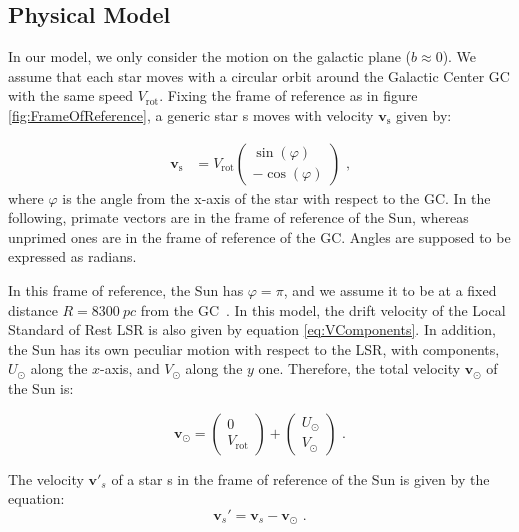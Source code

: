 \subsection{Physical Model}\label{subsec:PhysicalModel}


In our model, we only consider the motion on the galactic plane ($b\approx0$). We assume that each star moves with a circular orbit around the Galactic Center GC with the same speed $V_{\text{rot}}$. Fixing the frame of reference as in figure \ref{fig:FrameOfReference}, a generic star s moves with velocity $\bm{v}_{\text{s}}$ given by:

\begin{equation}\label{eq:VComponents}
    \begin{aligned}
        \bm{v}_{\text{s}} &= V_{\text{rot}}\begin{pmatrix} \sin(\varphi) \\ -\cos(\varphi) \end{pmatrix} \text{ ,}
    \end{aligned}
\end{equation}
\noindent
where $\varphi$ is the angle from the x-axis of the star with respect to the GC. In the following, primate vectors are in the frame of reference of the Sun, whereas unprimed ones are in the frame of reference of the GC. Angles are supposed to be expressed as radians.



In this frame of reference, the Sun has $\varphi = \pi$, and we assume it to be at a fixed distance $R=\qty{8300}{pc}$ from the GC~\cite{GalacticKinematics}. In this model, the drift velocity of the Local Standard of Rest LSR is also given by equation \ref{eq:VComponents}. In addition, the Sun has its own peculiar motion with respect to the LSR, with components, $U_{\odot}$ along the $x$-axis, and $V_{\odot}$ along the $y$ one. Therefore, the total velocity $\bm{v}_{\odot}$ of the Sun is:

\begin{equation}\label{eq:VSun}
    \bm{v}_{\odot} = \begin{pmatrix} 0 \\ V_{\text{rot}} \end{pmatrix} + \begin{pmatrix} U_{\odot} \\ V_{\odot} \end{pmatrix} \text{ .}
\end{equation}

\noindent
The velocity $\bm{v'}_s$ of a star s in the frame of reference of the Sun is given by the equation:
\begin{equation}\label{eq:ReferenceFrame}
    \bm{v}_s' = \bm{v}_s - \bm{v}_{\odot} \text{ .}
\end{equation}

